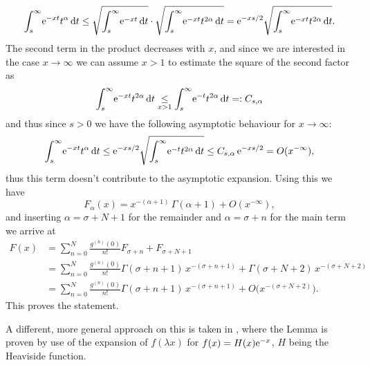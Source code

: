 \begin{Theorem}
\begin{Proof}
\begin{equation*}
      \Integ[\infty]{s}{t}{\Eto{-xt}t^\alpha} \le
      \sqrt{\Integ[\infty]{s}{t}{\Eto{-xt}}} \cdot
      \sqrt{\Integ[\infty]{s}{t}{\Eto{-xt}t^{2\alpha}}}
      = \Eto{-xs/2} \sqrt{\Integ[\infty]{s}{t}{\Eto{-xt}t^{2\alpha}}}.
    \end{equation*}
    The second term in the product decreases with $x$, and since we are
    interested in the case $x\to\infty$ we can assume $x>1$ to estimate the
    square of the second factor as
    \begin{equation*}
      \Integ[\infty]{s}{t}{\Eto{-xt}t^{2\alpha}} \underset{x>1}\le
      \Integ[\infty]{s}{t}{\Eto{-t}t^{2\alpha}} =: C_{s,\alpha}
    \end{equation*}
    and thus since $s>0$ we have the following asymptotic behaviour for
    $x\to\infty$:
    \begin{equation*}
      \Integ[\infty]{s}{t}{\Eto{-xt}t^\alpha} \le \Eto{-xs/2}
      \sqrt{\Integ[\infty]{s}{t}{\Eto{-t}t^{2\alpha}}}
      \le C_{s,\alpha}\,\Eto{-xs/2} = O(x^{-\infty}),
    \end{equation*}
    thus this term doesn't contribute to the asymptotic expansion. Using this we
    have
    \begin{equation*}
      F_\alpha(x) = x^{-(\alpha+1)}\,\Gamma(\alpha + 1) + O(x^{-\infty}),
    \end{equation*}
    and inserting $\alpha = \sigma + N + 1$ for the remainder and $\alpha =
    \sigma + n$ for the main term we arrive at
    \begin{align*}
      F(x) &= \sum_{n=0}^N \frac{g^{(n)}(0)}{n!} F_{\sigma+n}
            + F_{\sigma + N + 1} \\
           &= \sum_{n=0}^N \frac{g^{(n)}(0)}{n!}
            \Gamma(\sigma + n +1)\,x^{-(\sigma + n + 1)} + \Gamma(\sigma +
              N + 2)\,x^{-(\sigma + N + 2)} \\
           &= \sum_{n=0}^N \frac{g^{(n)}(0)}{n!}\Gamma(\sigma + n +
            1)\,x^{-(\sigma + n + 1)} + O\bigl(x^{-(\sigma + N + 2)}\bigr).
    \end{align*}
    This proves the statement.
  \end{Proof}
  \begin{Remark}
    A different, more general approach on this is taken in \cite[Ex.~53,
    p.104]{Estrada1993}, where the Lemma is proven by use of the expansion of
    $f(\lambda x)$ for $f(x) = H(x)\Eto{-x}$, $H$ being the Heaviside function.
  \end{Remark}
\end{Theorem}

